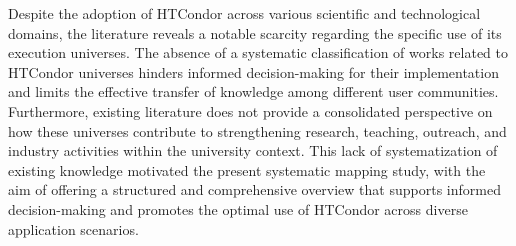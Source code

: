 \label{sec:motivacion}
Despite the adoption of HTCondor across various scientific and technological domains, the literature reveals a notable scarcity regarding the specific use of its execution universes.
The absence of a systematic classification of works related to HTCondor universes hinders informed decision-making for their implementation and limits the effective transfer of knowledge among different user communities. Furthermore, existing literature does not provide a consolidated perspective on how these universes contribute to strengthening research, teaching, outreach, and industry activities within the university context.
This lack of systematization of existing knowledge motivated the present systematic mapping study, with the aim of offering a structured and comprehensive overview that supports informed decision-making and promotes the optimal use of HTCondor across diverse application scenarios.
